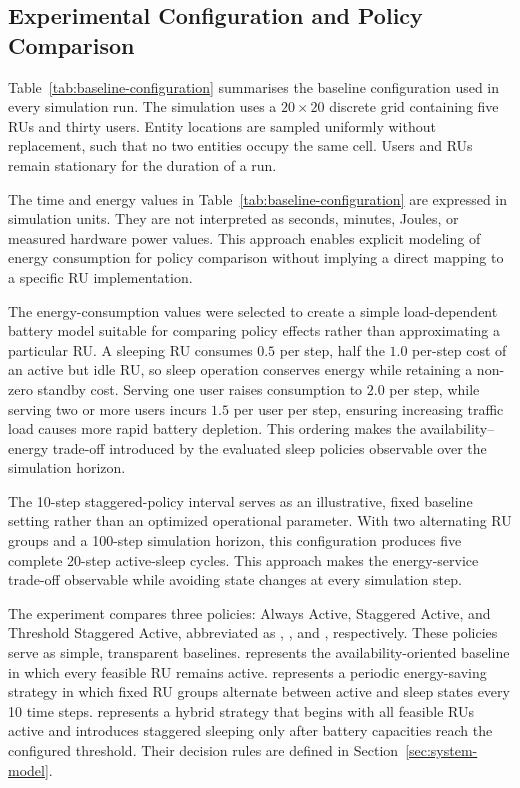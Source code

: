 



\subsection{Experimental Configuration and Policy Comparison}
\label{subsec:experimental-configuration}

Table~\ref{tab:baseline-configuration} summarises the baseline configuration used in every simulation run. The simulation uses a \(20\times20\) discrete grid containing five RUs and thirty users. Entity locations are sampled uniformly without replacement, such that no two entities occupy the same cell. Users and RUs remain stationary for the duration of a run.



The time and energy values in Table~\ref{tab:baseline-configuration} are expressed in simulation units. They are not interpreted as seconds, minutes, Joules, or measured hardware power values. This approach enables explicit modeling of energy consumption for policy comparison without implying a direct mapping to a specific RU implementation.

The energy-consumption values were selected to create a simple load-dependent battery model suitable for comparing policy effects rather than approximating a particular RU. A sleeping RU consumes \(0.5\) per step, half the \(1.0\) per-step cost of an active but idle RU, so sleep operation conserves energy while retaining a non-zero standby cost. Serving one user raises consumption to \(2.0\) per step, while serving two or more users incurs \(1.5\) per user per step, ensuring increasing traffic load causes more rapid battery depletion. This ordering makes the availability--energy trade-off introduced by the evaluated sleep policies observable over the simulation horizon.

The 10-step staggered-policy interval serves as an illustrative, fixed baseline setting rather than an optimized operational parameter. With two alternating RU groups and a 100-step simulation horizon, this configuration produces five complete 20-step active-sleep cycles. This approach makes the energy-service trade-off observable while avoiding state changes at every simulation step. 

The experiment compares three policies: Always Active, Staggered Active, and Threshold Staggered Active, abbreviated as , , and , respectively. These policies serve as simple, transparent baselines.  represents the availability-oriented baseline in which every feasible RU remains active.  represents a periodic energy-saving strategy in which fixed RU groups alternate between active and sleep states every 10 time steps.  represents a hybrid strategy that begins with all feasible RUs active and introduces staggered sleeping only after battery capacities reach the configured threshold. Their decision rules are defined in Section~\ref{sec:system-model}.


